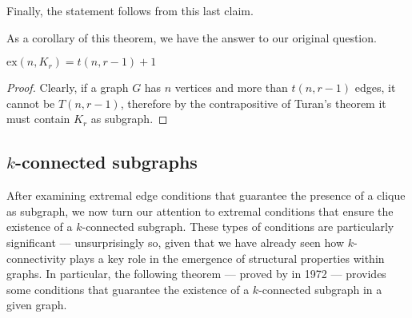 \documentclass[a4paper, 12pt]{report}
\begin{document}
{        

        Finally, the statement follows from this last claim.
    }

    As a corollary of this theorem, we have the answer to our original question.

    \begin{framedcor}{}
        $\mathrm{ex}(n, K_r) = t(n, r - 1) + 1$
    \end{framedcor}

    \begin{proof}
        Clearly, if a graph $G$ has $n$ vertices and more than $t(n, r - 1)$ edges, it cannot be $T(n, r - 1)$, therefore by the contrapositive of Turan's theorem it must contain $K_r$ as subgraph.
    \end{proof}

    \subsection{$k$-connected subgraphs}

    After examining extremal edge conditions that guarantee the presence of a clique as subgraph, we now turn our attention to extremal conditions that ensure the existence of a $k$-connected subgraph. These types of conditions are particularly significant --- unsurprisingly so, given that we have already seen how $k$-connectivity plays a key role in the emergence of structural properties within graphs. In particular, the following theorem --- proved by \textcite{mader} in 1972 --- provides some conditions that guarantee the existence of a $k$-connected subgraph in a given graph.
\end{document}
